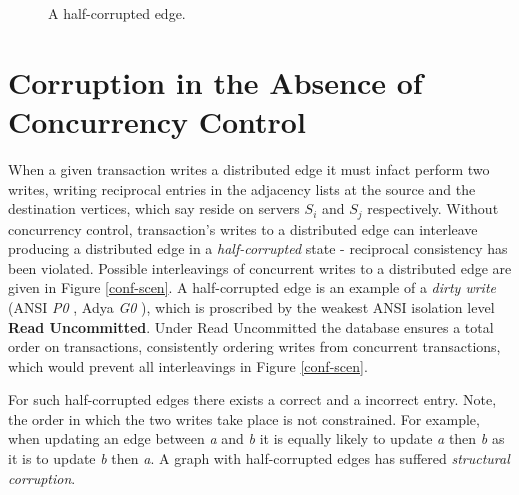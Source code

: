 \documentclass[sigplan,10pt]{acmart}
\begin{document}
\begin{figure}[H]
  \centering
  \caption{A half-corrupted edge.}
  \label{half-corrupted}
\end{figure}

\section{Corruption in the Absence of Concurrency Control}
\label{sec:db-corruption}

When a given transaction writes a distributed edge it must infact perform two writes, writing reciprocal entries in the adjacency lists at the source and the destination vertices, which say reside on servers $S_i$ and $S_j$ respectively. Without concurrency control, transaction's writes to a distributed edge can interleave producing a distributed edge in a \emph{half-corrupted} state - reciprocal consistency has been violated. Possible interleavings of concurrent writes to a distributed edge are given in Figure \ref{conf-scen}. A half-corrupted edge is an example of a \emph{dirty write} (ANSI \emph{P0} \cite{Berenson1995}, Adya \emph{G0} \cite{Adya2000}), which is proscribed by the weakest ANSI isolation level \textbf{Read Uncommitted}. Under Read Uncommitted the database ensures a total order on transactions, consistently ordering writes from concurrent transactions, which would prevent all interleavings in Figure \ref{conf-scen}.

For such half-corrupted edges there exists a correct and a incorrect entry. Note, the order in which the two writes take place is not constrained. For example, when updating an edge between \emph{a} and \emph{b} it is equally likely to update \emph{a} then \emph{b} as it is to update \emph{b} then \emph{a}. A graph with half-corrupted edges has suffered \emph{structural corruption}.
\end{document}
